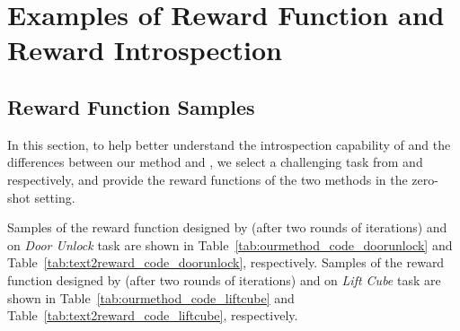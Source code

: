 \documentclass{article}
\theoremstyle{plain}
\theoremstyle{definition}
\theoremstyle{remark}
\begin{document}
\section{Examples of Reward Function and Reward Introspection}

\subsection{Reward Function Samples}
In this section, to help better understand the introspection capability of \ourmethod and the differences between our method and \tr, we select a challenging task from \MW and \MS respectively, and provide the reward functions of the two methods in the zero-shot setting.

Samples of the reward function designed by \ourmethod (after two rounds of iterations) and \tr on \MW \textit{Door Unlock} task are shown in Table~\ref{tab:ourmethod_code_doorunlock} and Table~\ref{tab:text2reward_code_doorunlock}, respectively. Samples of the reward function designed by \ourmethod (after two rounds of iterations) and \tr on \MS \textit{Lift Cube} task are shown in Table~\ref{tab:ourmethod_code_liftcube} and Table~\ref{tab:text2reward_code_liftcube}, respectively.
\end{document}
